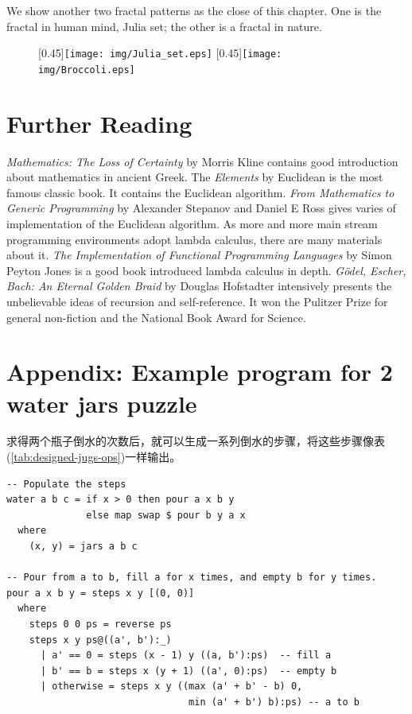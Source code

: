 \documentclass{article}
\begin{document}
We show another two fractal patterns as the close of this chapter. One is the fractal in human mind, Julia set; the other is a fractal in nature.

\begin{figure}[htbp]
 \centering
 [0.45\linewidth]{\texttt{[image: img/Julia\_set.eps]}}
 [0.45\linewidth]{\texttt{[image: img/Broccoli.eps]}}
 \label{fig:more-fractal}
\end{figure}

\section{Further Reading}

{\em Mathematics: The Loss of Certainty} by Morris Kline contains good introduction about mathematics in ancient Greek. The {\em Elements} by Euclidean is the most famous classic book. It contains the Euclidean algorithm. {\em From Mathematics to Generic Programming} by Alexander Stepanov and Daniel E Ross gives varies of implementation of the Euclidean algorithm. As more and more main stream programming environments adopt lambda calculus, there are many materials about it. {\em The Implementation of Functional Programming Languages} by Simon Peyton Jones is a good book introduced lambda calculus in depth. {\em Gödel, Escher, Bach: An Eternal Golden Braid} by Douglas Hofstadter intensively presents the unbelievable ideas of recursion and self-reference. It won the Pulitzer Prize for general non-fiction and the National Book Award for Science.

\section{Appendix: Example program for 2 water jars puzzle}

求得两个瓶子倒水的次数后，就可以生成一系列倒水的步骤，将这些步骤像表(\ref{tab:designed-jugs-ops})一样输出。

\lstset{frame=single}
\begin{lstlisting}
-- Populate the steps
water a b c = if x > 0 then pour a x b y
              else map swap $ pour b y a x
  where
    (x, y) = jars a b c

-- Pour from a to b, fill a for x times, and empty b for y times.
pour a x b y = steps x y [(0, 0)]
  where
    steps 0 0 ps = reverse ps
    steps x y ps@((a', b'):_)
      | a' == 0 = steps (x - 1) y ((a, b'):ps)  -- fill a
      | b' == b = steps x (y + 1) ((a', 0):ps)  -- empty b
      | otherwise = steps x y ((max (a' + b' - b) 0,
                                min (a' + b') b):ps) -- a to b
\end{lstlisting}
\end{document}
